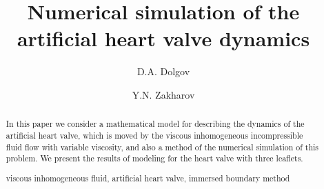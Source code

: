 \documentclass[runningheads,a4paper]{llncs}
\newcommand{\keywords}[1]{\par\addvspace\baselineskip
\noindent\keywordname\enspace\ignorespaces#1}
\begin{document}
\mainmatter  %

\title{Numerical simulation of the artificial heart valve dynamics}


%
%
\author{D.A. Dolgov \and Y.N. Zakharov}
%


%
%

\maketitle


\begin{abstract}
    In this paper we consider a mathematical model for describing the dynamics
    of the artificial heart valve, which is moved by the viscous inhomogeneous
    incompressible fluid flow with variable viscosity, and also a method
    of the numerical simulation of this problem. We present the results of modeling
    for the heart valve with three leaflets.
\keywords{viscous inhomogeneous fluid, artificial heart valve, immersed boundary method}
\end{abstract}
\end{document}
